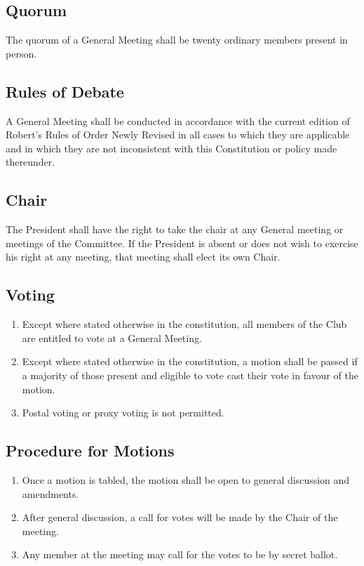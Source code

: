 \documentclass[11pt]{article} %
\begin{document}
\subsection{Quorum}
The quorum of a General Meeting shall be twenty ordinary members present in person.

\subsection{Rules of Debate}
A General Meeting shall be conducted in accordance with the current edition of Robert’s Rules of Order Newly Revised in all cases to which they are applicable and in which they are not inconsistent with this Constitution or policy made thereunder.

\subsection{Chair}
The President shall have the right to take the chair at any General meeting or meetings of the Committee. If the President is absent or does not wish to exercise his right at any meeting, that meeting shall elect its own Chair.

\subsection{Voting}
\begin{enumerate}
	\item Except where stated otherwise in the constitution, all members of the Club are entitled to vote at a General Meeting.
	\item Except where stated otherwise in the constitution, a motion shall be passed if a majority of those present and eligible to vote cast their vote in favour of the motion.
	\item Postal voting or proxy voting is not permitted.
\end{enumerate}

\subsection{Procedure for Motions}
\begin{enumerate}
	\item Once a motion is tabled, the motion shall be open to general discussion and amendments.
	\item After general discussion, a call for votes will be made by the Chair of the meeting.
	\item Any member at the meeting may call for the votes to be by secret ballot.
\end{enumerate}
\end{document}
